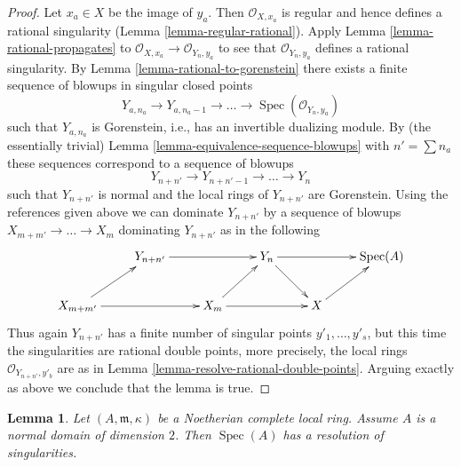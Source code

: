 \documentclass{stacks-project}
\theoremstyle{plain}
\newtheorem{lemma}[subsection]{Lemma}
\theoremstyle{definition}
\theoremstyle{remark}
\numberwithin{equation}{subsection}
\def\Spec{\mathop{\mathrm{Spec}}}
\begin{document}
\begin{proof}
\medskip\noindent
Let $x_a \in X$ be the image of $y_a$. Then $\mathcal{O}_{X, x_a}$
is regular and hence defines a rational singularity
(Lemma \ref{lemma-regular-rational}).
Apply Lemma \ref{lemma-rational-propagates} to
$\mathcal{O}_{X, x_a} \to \mathcal{O}_{Y_n, y_a}$
to see that $\mathcal{O}_{Y_n, y_a}$ defines a
rational singularity. By Lemma \ref{lemma-rational-to-gorenstein}
there exists a finite sequence of blowups in singular closed points
$$
Y_{a, n_a} \to Y_{a, n_a - 1} \to \ldots \to \Spec(\mathcal{O}_{Y_n, y_a})
$$
such that $Y_{a, n_a}$ is Gorenstein, i.e., has an
invertible dualizing module. By (the essentially trivial)
Lemma \ref{lemma-equivalence-sequence-blowups}
with $n' = \sum n_a$ these sequences correspond to a sequence of
blowups
$$
Y_{n + n'} \to Y_{n + n' - 1} \to \ldots \to Y_n
$$
such that $Y_{n + n'}$ is normal and
the local rings of $Y_{n + n'}$ are Gorenstein. Using the references
given above we can dominate $Y_{n + n'}$ by a sequence of blowups
$X_{m + m'} \to \ldots \to X_m$ dominating $Y_{n + n'}$ as in the following
$$
\xymatrix{
 & Y_{n + n'} \ar[rr] & & Y_n \ar[rd] \ar[rr] & & \Spec(A) \\
X_{m + m'} \ar[ru] \ar[rr] & & X_m \ar[rr] \ar[ru] & & X \ar[ru]
}
$$
Thus again $Y_{n + n'}$ has a finite number of singular points
$y'_1, \ldots, y'_s$, but this time the singularities are
rational double points, more precisely, the local rings
$\mathcal{O}_{Y_{n + n'}, y'_b}$ are as in
Lemma \ref{lemma-resolve-rational-double-points}.
Arguing exactly as above we conclude that the lemma is true.
\end{proof}

\begin{lemma}
\label{lemma-resolve-complete}
Let $(A, \mathfrak m, \kappa)$ be a Noetherian complete local ring.
Assume $A$ is a normal domain of dimension $2$. Then $\Spec(A)$ has a
resolution of singularities.
\end{lemma}
\end{document}
